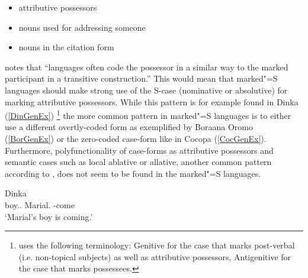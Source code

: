 \begin{itemize}
\item attributive possessors 
\item nouns used for addressing someone
\item nouns in the citation form
\end{itemize}

\citet[590]{Lander:2009} notes that ``languages often code the possessor in a similar way to the marked participant in a transitive construction.''
This would mean that marked"=S languages should make strong use of the S-case (nominative or ab\-so\-lu\-tive) for marking attributive possessors.
While this pattern is for example found in Dinka (\ref{DinGenEx})
\footnote{\citet{Andersen:1991} uses the following terminology: Genitive for the case that marks post-verbal (i.e. non-topical subjects) as well as attributive possessors, Antigenitive for the case that marks possessees.}
 the more common pattern in marked"=S languages is to either use a different overtly-coded form as exemplified by Boraana Oromo (\ref{BorGenEx}) or the zero-coded case-form like in Cocopa (\ref{CocGenEx}). 
Furthermore, polyfunctionality of case-forms as attributive possessors and semantic cases such as local ablative or allative, another common pattern according to \citet[590]{Lander:2009},  does not seem to be found in the marked"=S languages.  

\begin{exe} 
\ex\label{DinGenEx} {Dinka} \citep[Nilotic; Sudan; ][273]{Andersen:1991}\nopagebreak[4]
\gll{}  \textbf{} \\
boy.\antgen{}.\acc{} \partic{} Marial.\nom{} \decl{}-come\\
`Marial's boy is coming.'

\end{exe}

